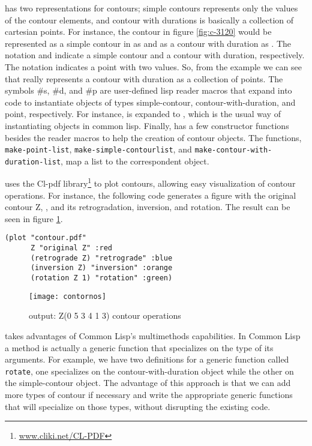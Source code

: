 \goiaba{} has two representations for contours; simple contours
represents only the values of the contour elements, and contour with
durations is basically a collection of cartesian points. For instance,
the contour in figure \ref{fig:c-3120} would be represented as a
simple contour in \goiaba{} as  and as a contour
with duration as . The
notation  and  indicate a simple
contour and a contour with duration, respectively. The notation
 indicates a point with two values. So, from the
example we can see that \goiaba{} really represents a contour with
duration as a collection of points. The symbols \#s, \#d, and \#p are
user-defined lisp reader macros that expand into code to instantiate
objects of types simple-contour, contour-with-duration, and point,
respectively. For instance,  is expanded to
, which is the usual way of
instantiating objects in common lisp. Finally, \goiaba{} has a few
constructor functions besides the reader macros to help the creation
of contour objects. The functions, \texttt{make-point-list},
\texttt{make-sim\-ple-contour\-list}, and
\texttt{make-contour-with-dura\-tion-list}, map a list to the
correspondent object.

\goiaba{} uses the Cl-pdf library\footnote{\url{www.cliki.net/CL-PDF}}
to plot contours, allowing easy visualization of contour operations.
For instance, the following code generates a figure with the original
contour Z, , and its retrogradation, inversion,
and rotation. The result can be seen in figure \ref{fig:operacoes}.

\begin{verbatim}
(plot "contour.pdf"
      Z "original Z" :red
      (retrograde Z) "retrograde" :blue
      (inversion Z) "inversion" :orange
      (rotation Z 1) "rotation" :green)
\end{verbatim}

\begin{figure}
  \centering
  \texttt{[image: contornos]}
  \caption{\goiaba{} output: Z(0 5 3 4 1 3) contour operations}
  \label{fig:operacoes}
\end{figure}

\goiaba{} takes advantages of Common Lisp's multimethods capabilities.
In Common Lisp a method is actually a generic function that
specializes on the type of its arguments. For example, we have two
definitions for a generic function called \texttt{rotate}, one
specializes on the contour-with-duration object while the other on the
simple-contour object. The advantage of this approach is that we can
add more types of contour if necessary and write the appropriate
generic functions that will specialize on those types, without
disrupting the existing code.

